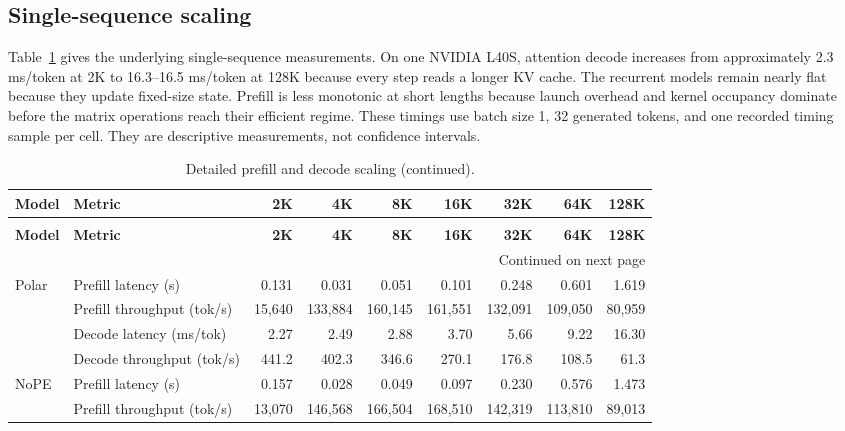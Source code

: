 \begin{landscape}
\subsection{Single-sequence scaling}
Table~\ref{table:serving_detailed_matrix} gives the underlying single-sequence measurements. On one NVIDIA L40S, attention decode increases from approximately 2.3 ms/token at 2K to 16.3--16.5 ms/token at 128K because every step reads a longer KV cache. The recurrent models remain nearly flat because they update fixed-size state. Prefill is less monotonic at short lengths because launch overhead and kernel occupancy dominate before the matrix operations reach their efficient regime. These timings use batch size 1, 32 generated tokens, and one recorded timing sample per cell. They are descriptive measurements, not confidence intervals.
\begingroup
\small
\setlength{\tabcolsep}{4pt}
\begin{longtable}{llrrrrrrr}
\caption{Detailed prefill and decode scaling from 2K to 128K tokens on one NVIDIA L40S GPU (batch size 1, 32 generated tokens).}\label{table:serving_detailed_matrix}\\
\toprule
\textbf{Model} & \textbf{Metric} & \textbf{2K} & \textbf{4K} & \textbf{8K} & \textbf{16K} & \textbf{32K} & \textbf{64K} & \textbf{128K} \\
\midrule
\endfirsthead
\caption[]{Detailed prefill and decode scaling (continued).}\\
\toprule
\textbf{Model} & \textbf{Metric} & \textbf{2K} & \textbf{4K} & \textbf{8K} & \textbf{16K} & \textbf{32K} & \textbf{64K} & \textbf{128K} \\
\midrule
\endhead
\midrule
\multicolumn{9}{r}{Continued on next page}\\
\endfoot
\bottomrule
\endlastfoot
Polar & Prefill latency (s) & 0.131 & 0.031 & 0.051 & 0.101 & 0.248 & 0.601 & 1.619 \\
& Prefill throughput (tok/s) & 15,640 & 133,884 & 160,145 & 161,551 & 132,091 & 109,050 & 80,959 \\
& Decode latency (ms/tok) & 2.27 & 2.49 & 2.88 & 3.70 & 5.66 & 9.22 & 16.30 \\
& Decode throughput (tok/s) & 441.2 & 402.3 & 346.6 & 270.1 & 176.8 & 108.5 & 61.3 \\
\midrule
NoPE & Prefill latency (s) & 0.157 & 0.028 & 0.049 & 0.097 & 0.230 & 0.576 & 1.473 \\
& Prefill throughput (tok/s) & 13,070 & 146,568 & 166,504 & 168,510 & 142,319 & 113,810 & 89,013 \\

\end{longtable}
\end{landscape}
